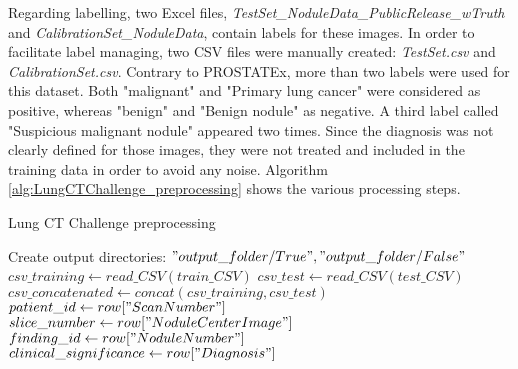 Regarding labelling, two Excel files, \textit{TestSet\_NoduleData\_PublicRelease\_wTruth} and \textit{CalibrationSet\_NoduleData}, contain labels for these images. In order to facilitate label managing, two CSV files were manually created: \textit{TestSet.csv} and \textit{CalibrationSet.csv}.
Contrary to PROSTATEx, more than two labels were used for this dataset. Both "malignant" and "Primary lung cancer" were considered as positive, whereas "benign" and "Benign nodule" as negative. A third label called "Suspicious malignant nodule" appeared two times. Since the diagnosis was not clearly defined for those images, they were not treated and included in the training data in order to avoid any noise. Algorithm \ref{alg:LungCTChallenge_preprocessing} shows the various processing steps.

\begin{algorithm}
    \caption{Lung CT Challenge preprocessing}
    \label{alg:LungCTChallenge_preprocessing}
    \begin{algorithmic}[1] %
        		\State Create output directories: $"output\_folder/True", "output\_folder/False"$\\
        		\State $csv\_training \gets read\_CSV(train\_CSV)$ 
        		\State $csv\_test \gets read\_CSV(test\_CSV)$ 
            \State $csv\_concatenated \gets concat(csv\_training, csv\_test)$\\
            		\State $patient\_id \gets row["Scan Number"]$
            		\State $slice\_number \gets row["Nodule Center Image"]$ 
            		\State $finding\_id \gets row["Nodule Number"]$
            		\State $clinical\_significance \gets row["Diagnosis"]$\\
            		\EndIf\\
                					 
                				\EndIf
                			\EndFor
            			\EndFor
            		\EndFor
            \EndFor
        \EndProcedure
    \end{algorithmic}
\end{algorithm}


